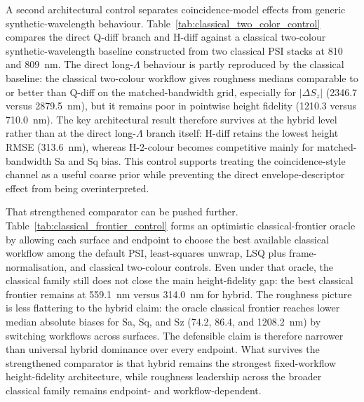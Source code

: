 \documentclass[photonics,article,submit,pdftex,moreauthors]{Definitions/mdpi}
\begin{document}
A second architectural control separates coincidence-model effects from generic synthetic-wavelength behaviour. Table~\ref{tab:classical_two_color_control} compares the direct Q-diff branch and H-diff against a classical two-colour synthetic-wavelength baseline constructed from two classical PSI stacks at 810 and 809~nm. The direct long-$\Lambda$ behaviour is partly reproduced by the classical baseline: the classical two-colour workflow gives roughness medians comparable to or better than Q-diff on the matched-bandwidth grid, especially for $|\Delta S_z|$ (2346.7 versus 2879.5~nm), but it remains poor in pointwise height fidelity (1210.3 versus 710.0~nm). The key architectural result therefore survives at the hybrid level rather than at the direct long-$\Lambda$ branch itself: H-diff retains the lowest height RMSE (313.6~nm), whereas H-2-colour becomes competitive mainly for matched-bandwidth Sa and Sq bias. This control supports treating the coincidence-style channel as a useful coarse prior while preventing the direct envelope-descriptor effect from being overinterpreted.



That strengthened comparator can be pushed further. Table~\ref{tab:classical_frontier_control} forms an optimistic classical-frontier oracle by allowing each surface and endpoint to choose the best available classical workflow among the default PSI, least-squares unwrap, LSQ plus frame-normalisation, and classical two-colour controls. Even under that oracle, the classical family still does not close the main height-fidelity gap: the best classical frontier remains at 559.1~nm versus 314.0~nm for hybrid. The roughness picture is less flattering to the hybrid claim: the oracle classical frontier reaches lower median absolute biases for Sa, Sq, and Sz (74.2, 86.4, and 1208.2~nm) by switching workflows across surfaces. The defensible claim is therefore narrower than universal hybrid dominance over every endpoint. What survives the strengthened comparator is that hybrid remains the strongest fixed-workflow height-fidelity architecture, while roughness leadership across the broader classical family remains endpoint- and workflow-dependent.


\end{document}
